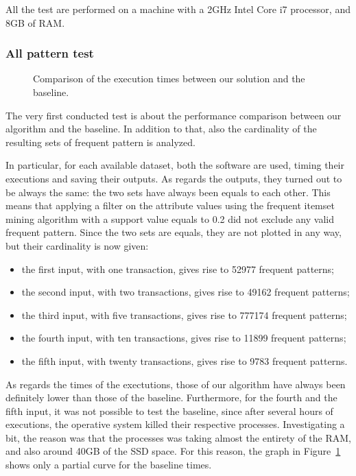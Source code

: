 \documentclass{acm_proc_article-sp-sigmod09}
\begin{document}
All the test are performed on a machine with a 2GHz Intel Core i7 processor, and 8GB of RAM.

\subsubsection{All pattern test}

\begin{figure}
\centering
{}
\caption{Comparison of the execution times between our solution and the baseline.}
\label{fig:testone}
\end{figure}

The very first conducted test is about the performance comparison between our algorithm and the baseline. In addition to that, also the cardinality of the resulting sets of frequent pattern is analyzed.

In particular, for each available dataset, both the software are used, timing their executions and saving their outputs. As regards the outputs, they turned out to be always the same: the two sets have always been equals to each other. This means that applying a filter on the attribute values using the frequent itemset mining algorithm with a support value equals to 0.2 did not exclude any valid frequent pattern. Since the two sets are equals, they are not plotted in any way, but their cardinality is now given:
\begin{itemize}
\item the first input, with one transaction, gives rise to 52977 frequent patterns;
\item the second input, with two transactions, gives rise to 49162 frequent patterns;
\item the third input, with five transactions, gives rise to 777174 frequent patterns;
\item the fourth input, with ten transactions, gives rise to 11899 frequent patterns;
\item the fifth input, with twenty transactions, gives rise to 9783 frequent patterns.
\end{itemize}

As regards the times of the exectutions, those of our algorithm have always been definitely lower than those of the baseline. Furthermore, for the fourth and the fifth input, it was not possible to test the baseline, since after several hours of executions, the operative system killed their respective processes. Investigating a bit, the reason was that the processes was taking almost the entirety of the RAM, and also around 40GB of the SSD space. For this reason, the graph in Figure~\ref{fig:testone} shows only a partial curve for the baseline times. 
\end{document}
